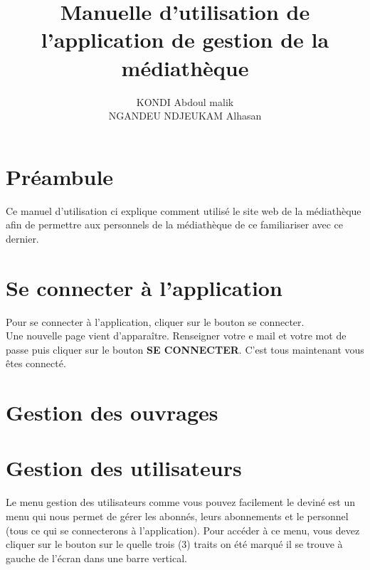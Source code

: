 \documentclass[12pt,a4paper]{article}
\author{KONDI Abdoul malik \\ NGANDEU NDJEUKAM Alhasan}
\title{Manuelle d'utilisation de l'application de gestion de la médiathèque}
\begin{document}
\maketitle
\tableofcontents
\newpage

\section{Préambule}
Ce manuel d'utilisation ci explique comment utilisé le site web de la médiathèque afin
de permettre aux personnels de la médiathèque de ce familiariser avec ce dernier.

\newpage
\section{Se connecter à l'application}
Pour se connecter à l'application, cliquer sur le bouton se connecter.\\
Une nouvelle page vient d'apparaître. Renseigner votre e mail et votre mot de passe 
puis cliquer sur le bouton \textbf{SE CONNECTER}. C'est tous maintenant vous êtes 
connecté.

\newpage
\section{Gestion des ouvrages}



































\newpage
\section{Gestion des utilisateurs}
Le menu gestion des utilisateurs comme vous pouvez facilement le deviné est un menu qui
nous permet de gérer les abonnés, leurs abonnements et le personnel (tous ce qui se
connecterons à l'application). Pour accéder à ce menu, vous devez cliquer sur le bouton sur le
quelle trois (3) traits on été marqué il se trouve à gauche de l'écran dans une barre
vertical. \\
\end{document}
